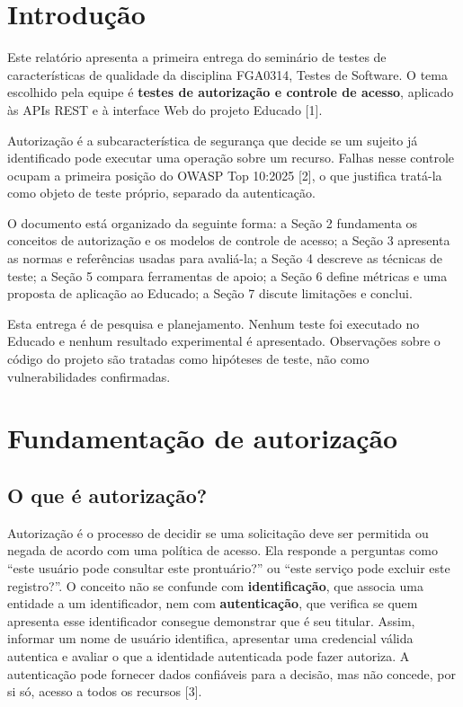\section{Introdução}\label{introduuxe7uxe3o}

Este relatório apresenta a primeira entrega do seminário de testes de
características de qualidade da disciplina FGA0314, Testes de Software.
O tema escolhido pela equipe é \textbf{testes de autorização e controle
de acesso}, aplicado às APIs REST e à interface Web do projeto Educado
{[}1{]}.

Autorização é a subcaracterística de segurança que decide se um sujeito
já identificado pode executar uma operação sobre um recurso. Falhas
nesse controle ocupam a primeira posição do OWASP Top 10:2025 {[}2{]}, o
que justifica tratá-la como objeto de teste próprio, separado da
autenticação.

O documento está organizado da seguinte forma: a Seção 2 fundamenta os
conceitos de autorização e os modelos de controle de acesso; a Seção 3
apresenta as normas e referências usadas para avaliá-la; a Seção 4
descreve as técnicas de teste; a Seção 5 compara ferramentas de apoio; a
Seção 6 define métricas e uma proposta de aplicação ao Educado; a Seção
7 discute limitações e conclui.

Esta entrega é de pesquisa e planejamento. Nenhum teste foi executado no
Educado e nenhum resultado experimental é apresentado. Observações sobre
o código do projeto são tratadas como hipóteses de teste, não como
vulnerabilidades confirmadas.

\section{Fundamentação de
autorização}\label{fundamentauxe7uxe3o-de-autorizauxe7uxe3o}

\subsection{O que é autorização?}\label{o-que-uxe9-autorizauxe7uxe3o}

Autorização é o processo de decidir se uma solicitação deve ser
permitida ou negada de acordo com uma política de acesso. Ela responde a
perguntas como ``este usuário pode consultar este prontuário?'' ou
``este serviço pode excluir este registro?''. O conceito não se confunde
com \textbf{identificação}, que associa uma entidade a um identificador,
nem com \textbf{autenticação}, que verifica se quem apresenta esse
identificador consegue demonstrar que é seu titular. Assim, informar um
nome de usuário identifica, apresentar uma credencial válida autentica e
avaliar o que a identidade autenticada pode fazer autoriza. A
autenticação pode fornecer dados confiáveis para a decisão, mas não
concede, por si só, acesso a todos os recursos {[}3{]}.

